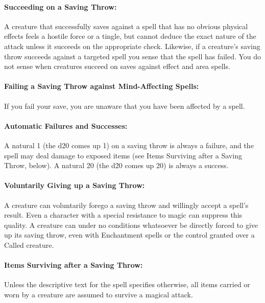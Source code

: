 \paragraph{Succeeding on a Saving Throw:} A creature that successfully saves against a spell that has no obvious physical effects feels a hostile force or a tingle, 
but cannot deduce the exact nature of the attack unless it succeeds on the appropriate  check. 
Likewise, if a creature's saving throw succeeds against a targeted spell you sense that the spell has failed. 
You do not sense when creatures succeed on saves against effect and area spells.

\paragraph{Failing a Saving Throw against Mind-Affecting Spells:} If you fail your save, you are unaware that you have been affected by a spell.

\paragraph{Automatic Failures and Successes:} A natural 1 (the d20 comes up 1) on a saving throw is always a failure, and the spell may deal damage to exposed items (see Items Surviving after a Saving Throw, below). A natural 20 (the d20 comes up 20) is always a success.

\paragraph{Voluntarily Giving up a Saving Throw:} A creature can voluntarily forego a saving throw and willingly accept a spell's result. Even a character with a special resistance to magic can suppress this quality.
A creature  can under no conditions whatsoever be directly forced to give up its saving throw, even with Enchantment spells or the control granted over a Called creature.

\paragraph{Items Surviving after a Saving Throw:} Unless the descriptive text for the spell specifies otherwise, all items carried or worn by a creature are assumed to survive a magical attack.

